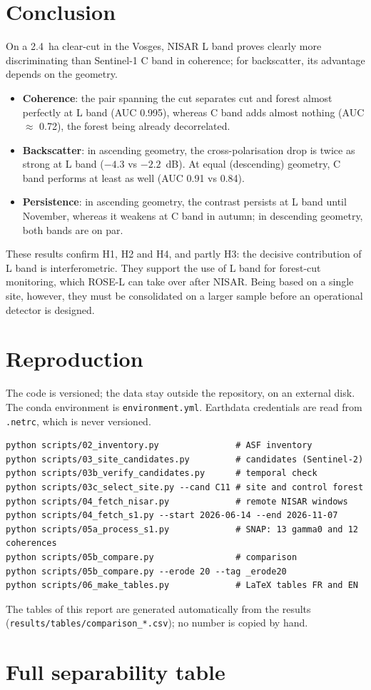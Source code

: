 \documentclass[11pt,a4paper]{article}
\begin{document}
\section{Conclusion}

On a 2.4~ha clear-cut in the Vosges, NISAR L band proves clearly more discriminating than Sentinel-1 C band in
coherence; for backscatter, its advantage depends on the geometry.
\begin{itemize}
\item \textbf{Coherence}: the pair spanning the cut separates cut and forest almost perfectly at L band
  (AUC 0.995), whereas C band adds almost nothing (AUC $\approx$ 0.72), the forest being already decorrelated.
\item \textbf{Backscatter}: in ascending geometry, the cross-polarisation drop is twice as strong at L band
  ($-4.3$ vs $-2.2$~dB). At equal (descending) geometry, C band performs at least as well (AUC 0.91 vs 0.84).
\item \textbf{Persistence}: in ascending geometry, the contrast persists at L band until November, whereas it weakens
  at C band in autumn; in descending geometry, both bands are on par.
\end{itemize}
These results confirm H1, H2 and H4, and partly H3: the decisive contribution of L band is interferometric. They
support the use of L band for forest-cut monitoring, which ROSE-L can take over after NISAR. Being based on a
single site, however, they must be consolidated on a larger sample before an operational detector is designed.

\printbibliography[heading=bibintoc,title={References}]

\appendix
\section{Reproduction}

The code is versioned; the data stay outside the repository, on an external disk. The conda environment is
\texttt{environment.yml}. Earthdata credentials are read from \texttt{.netrc}, which is never versioned.

\begin{verbatim}
python scripts/02_inventory.py               # ASF inventory
python scripts/03_site_candidates.py         # candidates (Sentinel-2)
python scripts/03b_verify_candidates.py      # temporal check
python scripts/03c_select_site.py --cand C11 # site and control forest
python scripts/04_fetch_nisar.py             # remote NISAR windows
python scripts/04_fetch_s1.py --start 2026-06-14 --end 2026-11-07
python scripts/05a_process_s1.py             # SNAP: 13 gamma0 and 12 coherences
python scripts/05b_compare.py                # comparison
python scripts/05b_compare.py --erode 20 --tag _erode20
python scripts/06_make_tables.py             # LaTeX tables FR and EN
\end{verbatim}

The tables of this report are generated automatically from the results
(\texttt{results/tables/comparison\_*.csv}); no number is copied by hand.

\section{Full separability table}


\end{document}
